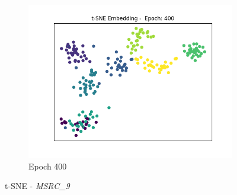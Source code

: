 \begin{figure}[!ht]
			\begin{subfigure}{0.3\textwidth}
				\centering
				\includegraphics[width=1.1\linewidth]{images/plotE6_tSNE_e400_MSRC_9_E_GDL_22_00h-05mExp3pullpush}
				\caption{Epoch 400}
				\label{fig:plote6tsnee400msrc9egdl2200h-05mexp3pullpush}
			\end{subfigure}
			\caption{t-SNE - \textit{MSRC\_9}}
			\label{fig:E6tSNE2}
		\end{figure}
		
		
	